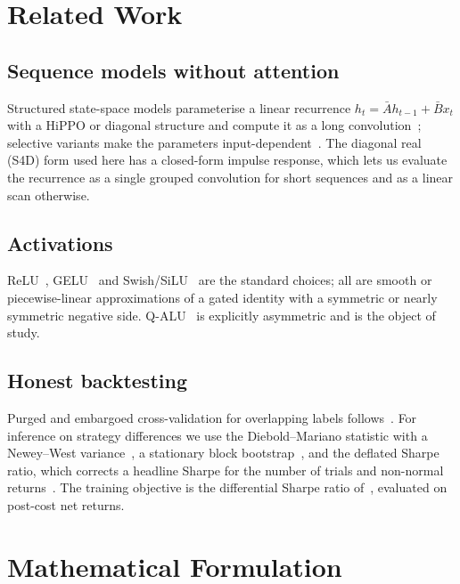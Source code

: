 \documentclass[conference]{IEEEtran}
\begin{document}
\section{Related Work}

\subsection{Sequence models without attention}
Structured state-space models parameterise a linear recurrence
$h_t = \bar{A}h_{t-1}+\bar{B}x_t$ with a HiPPO or diagonal structure and
compute it as a long convolution~\cite{s4}; selective variants make the
parameters input-dependent~\cite{mamba}. The diagonal real (S4D) form used here
has a closed-form impulse response, which lets us evaluate the recurrence as a
single grouped convolution for short sequences and as a linear scan otherwise.

\subsection{Activations}
ReLU~\cite{relu}, GELU~\cite{gelu} and Swish/SiLU~\cite{swish} are the standard
choices; all are smooth or piecewise-linear approximations of a gated identity
with a symmetric or nearly symmetric negative side. Q-ALU~\cite{qalu} is
explicitly asymmetric and is the object of study.

\subsection{Honest backtesting}
Purged and embargoed cross-validation for overlapping labels
follows~\cite{purgedcv}. For inference on strategy differences we use the
Diebold--Mariano statistic with a Newey--West variance~\cite{dm,nw}, a
stationary block bootstrap~\cite{politis}, and the deflated Sharpe ratio, which
corrects a headline Sharpe for the number of trials and non-normal
returns~\cite{dsr,psr}. The training objective is the differential Sharpe ratio
of~\cite{moody}, evaluated on post-cost net returns.

\section{Mathematical Formulation}
\label{sec:math}
\end{document}
